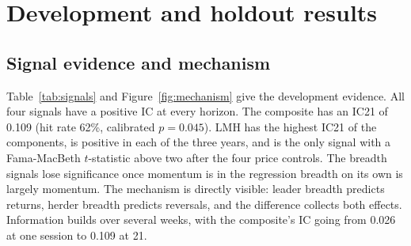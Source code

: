 \section{Development and holdout results}\label{sec:results}

\subsection{Signal evidence and mechanism}

Table~\ref{tab:signals} and Figure~\ref{fig:mechanism} give the development evidence. All four signals have a positive IC at every horizon. The composite has an IC21 of 0.109 (hit rate 62\%, calibrated $p = 0.045$). LMH has the highest IC21 of the components, is positive in each of the three years, and is the only signal with a Fama-MacBeth $t$-statistic above two after the four price controls. The breadth signals lose significance once momentum is in the regression breadth on its own is largely momentum. The mechanism is directly visible: leader breadth predicts returns, herder breadth predicts reversals, and the difference collects both effects. Information builds over several weeks, with the composite's IC going from 0.026 at one session to 0.109 at 21.

